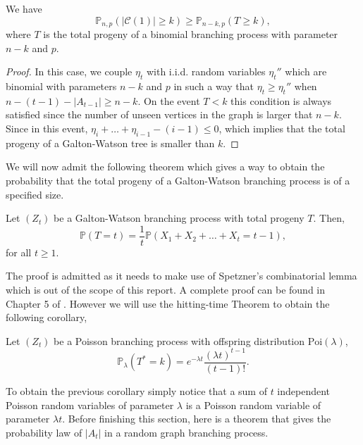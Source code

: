 \begin{theorem}\label{th:lowbin}
	We have
	\begin{equation}
		\mathbb{P}_{n,p}(|\mathcal{C}(1)| \geq k) \geq \mathbb{P}_{n-k,p}(T\geq k),
	\end{equation}
	where $T$ is the total progeny of a binomial branching process with parameter $n-k$ and $p$.
\end{theorem}
\begin{proof}
	In this case, we couple $\eta_t$ with i.i.d. random variables $\eta_t''$ which are binomial with parameters $n-k$ and $p$ in such a way that $\eta_t \geq \eta_t''$ when $n-(t-1)-|A_{t-1}| \geq n-k$.
	On the event $T<k$ this condition is always satisfied since the number of unseen vertices in the graph is larger that $n-k$. 
	Since in this event, $\eta_i + \ldots + \eta_{i-1} - (i-1) \leq 0$, which implies that the total progeny of a Galton-Watson tree is smaller than $k$.
\end{proof}
We will now admit the following theorem which gives a way to obtain the probability that the total progeny of a Galton-Watson branching process is of a specified size.
\begin{theorem}
	Let $(Z_t)$ be a Galton-Watson branching process with total progeny $T$. Then,
	\begin{equation}
		\mathbb{P}(T = t) = \frac{1}{t} \mathbb{P}(X_1 + X_2 + \ldots + X_t = t-1),
	\end{equation}
	for all $t\geq 1$.
\end{theorem}
The proof is admitted as it needs to make use of Spetzner's combinatorial lemma which is out of the scope of this report. 
A complete proof can be found in Chapter 5 of \cite{Roch15}.
\newline
However we will use the hitting-time Theorem to obtain the following corollary,
\begin{corollary}\label{th:sizePoi}
	Let $(Z_t)$ be a Poisson branching process with offspring distribution $\text{Poi}(\lambda)$,
	\begin{equation}
		\mathbb{P}_{\lambda}(T^* = k) = e^{-\lambda t}\frac{(\lambda t)^{t-1}}{(t-1)!}.
	\end{equation}
\end{corollary}
To obtain the previous corollary simply notice that a sum of $t$ independent Poisson random variables of parameter $\lambda$ is a Poisson random variable of parameter $\lambda t$.
Before finishing this section, here is a theorem that gives the probability law of $|A_t|$ in a random graph branching process.
